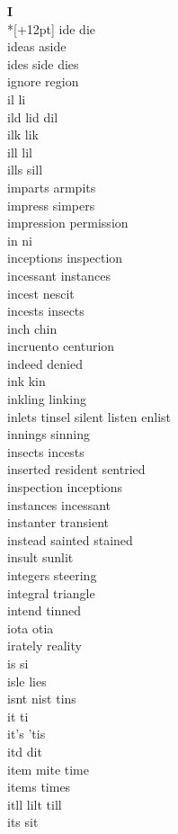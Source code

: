 \vspace{14pt}
\noindent\textbf{\Large I}\\*[+12pt]
ide die\\
ideas aside\\
ides side dies\\
ignore region\\
il li\\
ild lid dil\\
ilk lik\\
ill lil\\
ills sill\\
imparts armpits\\
impress simpers\\
impression permission\\
in ni\\
inceptions inspection\\
incessant instances\\
incest nescit\\
incests insects\\
inch chin\\
incruento centurion\\
indeed denied\\
ink kin\\
inkling linking\\
inlets tinsel silent listen enlist\\
innings sinning\\
insects incests\\
inserted resident sentried\\
inspection inceptions\\
instances incessant\\
instanter transient\\
instead sainted stained\\
insult sunlit\\
integers steering\\
integral triangle\\
intend tinned\\
iota otia\\
irately reality\\
is si\\
isle lies\\
isnt nist tins\\
it ti\\
it's 'tis\\
itd dit\\
item mite time\\
items times\\
itll lilt till\\
its sit\\

